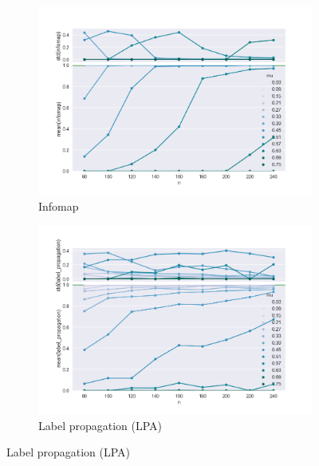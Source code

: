 \begin{figure}
    \begin{subfigure}[b]{0.32\textwidth}
        \includegraphics[width=\textwidth]{fig/ami_vs_n_infomap}
        \caption{Infomap}
        \label{fig:mouse}
    \end{subfigure}
	\qquad
    \begin{subfigure}[b]{0.32\textwidth}
        \includegraphics[width=\textwidth]{fig/ami_vs_n_label_propagation}
        \caption{Label propagation (LPA)}
        \label{fig:gull}
    \end{subfigure}
    

\end{figure}
